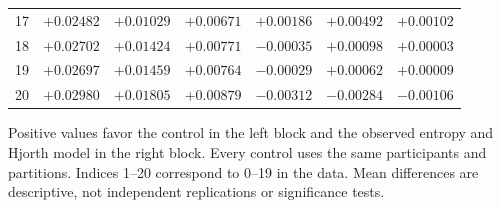 \begin{table}[!htbp]
\begin{tabular}{r rrr rrr}
17 & $+0.02482$ & $+0.01029$ & $+0.00671$ & $+0.00186$ & $+0.00492$ & $+0.00102$\\
18 & $+0.02702$ & $+0.01424$ & $+0.00771$ & $-0.00035$ & $+0.00098$ & $+0.00003$\\
19 & $+0.02697$ & $+0.01459$ & $+0.00764$ & $-0.00029$ & $+0.00062$ & $+0.00009$\\
20 & $+0.02980$ & $+0.01805$ & $+0.00879$ & $-0.00312$ & $-0.00284$ & $-0.00106$\\
\bottomrule\end{tabular}
\par\smallskip\begin{minipage}{\textwidth}\footnotesize Positive values favor the control in the left block and the observed entropy and Hjorth model in the right block. Every control uses the same participants and partitions. Indices 1--20 correspond to 0--19 in the data. Mean differences are descriptive, not independent replications or significance tests.\end{minipage}
\end{table}
